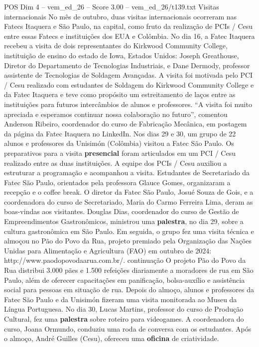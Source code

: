 \begin{textsample}{POS Dim 4 – vem\_ed\_26 – Score 3.00 – vem\_ed\_26/t139.txt}  \label{ex:f4_pos_014}
Visitas internacionais No mês de outubro, duas visitas internacionais ocorreram nas Fatecs Itaquera e São Paulo, na capital, como fruto da realização de PCIs / Cesu entre essas Fatecs e instituições dos EUA e Colômbia.
No dia 16, a Fatec Itaquera recebeu a visita de dois representantes do Kirkwood Community College, instituição de ensino do estado de Iowa, Estados Unidos: Joseph Greathouse, Diretor do Departamento de Tecnologias Industriais, e Dane Dermody, professor assistente de Tecnologias de Soldagem Avançadas.
A visita foi motivada pelo PCI / Cesu realizado com estudantes de Soldagem do Kirkwood Community College e da Fatec Itaquera e teve como propósito um estreitamento de laços entre as instituições para futuros intercâmbios de alunos e professores. “A visita foi muito apreciada e esperamos continuar nossa colaboração no futuro”, comentou Anderson Ribeiro, coordenador do curso de Fabricação Mecânica, em postagem da página da Fatec Itaquera no LinkedIn.
Nos dias 29 e 30, um grupo de 22 alunos e professores da Unisimón (Colômbia) visitou a Fatec São Paulo.
Os preparativos para a visita \textbf{presencial} foram articulados em um PCI / Cesu realizado entre as duas instituições.
A equipe dos PCIs / Cesu auxiliou a estruturar a programação e acompanhou a visita.
Estudantes de Secretariado da Fatec São Paulo, orientados pela professora Glauce Gomes, organizaram a recepção e o coffee break.
O diretor da Fatec São Paulo, Josué Souza de Gois, e a coordenadora do curso de Secretariado, Maria do Carmo Ferreira Lima, deram as boas-vindas aos visitantes.
Douglas Dias, coordenador do curso de Gestão de Empreendimentos Gastronômicos, ministrou uma \textbf{palestra}, no dia 29, sobre a cultura gastronômica em São Paulo.
Em seguida, o grupo fez uma visita técnica e almoçou no Pão do Povo da Rua, projeto premiado pela Organização das Nações Unidas para Alimentação e Agricultura (FAO) em outubro de 2024: http://www.paodopovodaarua.com.br/. continuação O projeto Pão do Povo da Rua distribui 3.000 pães e 1.500 refeições diariamente a moradores de rua em São Paulo, além de oferecer capacitações em panificação, bolsa-auxílio e assistência social para pessoas em situação de rua.
Depois do almoço, alunos e professores da Fatec São Paulo e da Unisimón fizeram uma visita monitorada ao Museu da Língua Portuguesa.
No dia 30, Lucas Martins, professor do curso de Produção Cultural, fez uma \textbf{palestra} sobre roteiro para videogames.
A coordenadora do curso, Joana Ormundo, conduziu uma roda de conversa com os estudantes.
Após o almoço, André Guilles (Cesu), ofereceu uma \textbf{oficina} de criatividade.

\end{textsample}
